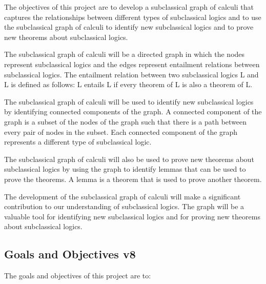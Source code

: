 The objectives of this project are to develop a subclassical graph of
calculi that captures the relationships between different types of
subclassical logics and to use the subclassical graph of calculi to
identify new subclassical logics and to prove new theorems about
subclassical logics.

The subclassical graph of calculi will be a directed graph in which the
nodes represent subclassical logics and the edges represent entailment
relations between subclassical logics. The entailment relation between
two subclassical logics L and L\textquotesingle{} is defined as follows:
L entails L\textquotesingle{} if every theorem of L is also a theorem of
L\textquotesingle.

The subclassical graph of calculi will be used to identify new
subclassical logics by identifying connected components of the graph. A
connected component of the graph is a subset of the nodes of the graph
such that there is a path between every pair of nodes in the subset.
Each connected component of the graph represents a different type of
subclassical logic.

The subclassical graph of calculi will also be used to prove new
theorems about subclassical logics by using the graph to identify lemmas
that can be used to prove the theorems. A lemma is a theorem that is
used to prove another theorem.

The development of the subclassical graph of calculi will make a
significant contribution to our understanding of subclassical logics.
The graph will be a valuable tool for identifying new subclassical
logics and for proving new theorems about subclassical logics.

\hypertarget{goals-and-objectives-v8}{%
\subsection{Goals and Objectives v8}\label{goals-and-objectives-v8}}

The goals and objectives of this project are to:

